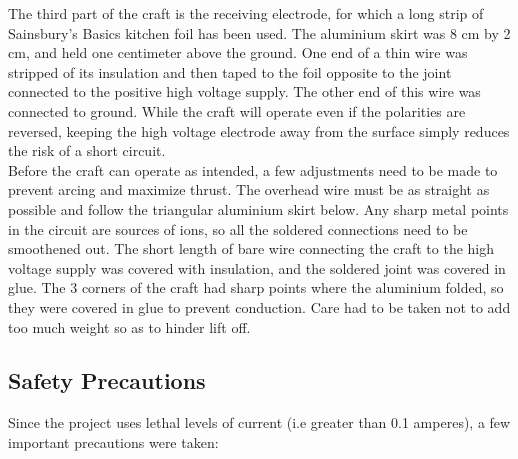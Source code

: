 \documentclass[11pt]{article}
\begin{document}
The third part of the craft is the receiving electrode, for which a long strip of Sainsbury's Basics kitchen foil has been used. The aluminium skirt was 8 cm by 2 cm, and held one centimeter above the ground. One end of a thin wire was stripped of its insulation and then taped to the foil opposite to the joint connected to the positive high voltage supply. The other end of this wire was connected to ground. While the craft will operate even if the polarities are reversed, keeping the high voltage electrode away from the surface simply reduces the risk of a short circuit.\\

Before the craft can operate as intended, a few adjustments need to be made to prevent arcing and maximize thrust. The overhead wire must be as straight as possible and follow the triangular aluminium skirt below. Any sharp metal points in the circuit are sources of ions, so all the soldered connections need to be smoothened out. The short length of bare wire connecting the craft to the high voltage supply was covered with insulation, and the soldered joint was covered in glue. The 3 corners of the craft had sharp points where the aluminium folded, so they were covered in glue to prevent conduction. Care had to be taken not to add too much weight so as to hinder lift off.


\subsection{Safety Precautions}

Since the project uses lethal levels of current (i.e greater than 0.1 amperes), a few important precautions were taken:
\end{document}
